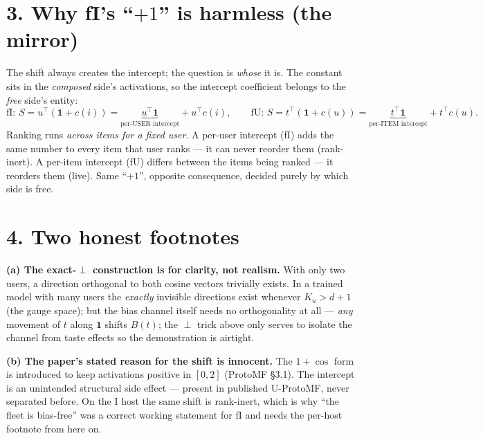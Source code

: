 \documentclass[11pt,a4paper]{article}
\begin{document}
\section*{3. Why fI's ``$+1$'' is harmless (the mirror)}

The shift always creates the intercept; the question is \emph{whose} it is.
The constant sits in the \emph{composed} side's activations, so the intercept
coefficient belongs to the \emph{free} side's entity:
\[
\text{fI: } S = u^{\top}(\mathbf{1}+c(i)) = \underbrace{u^{\top}\mathbf{1}}_{\text{per-USER intercept}} + u^{\top}c(i),
\qquad
\text{fU: } S = t^{\top}(\mathbf{1}+c(u)) = \underbrace{t^{\top}\mathbf{1}}_{\text{per-ITEM intercept}} + t^{\top}c(u).
\]
Ranking runs \emph{across items for a fixed user}. A per-user intercept (fI)
adds the same number to every item that user ranks --- it can never reorder
them (rank-inert). A per-item intercept (fU) differs between the items being
ranked --- it reorders them (live). Same ``$+1$'', opposite consequence,
decided purely by which side is free.

\section*{4. Two honest footnotes}

\textbf{(a) The exact-$\perp$ construction is for clarity, not realism.} With
only two users, a direction orthogonal to both cosine vectors trivially
exists. In a trained model with many users the \emph{exactly} invisible
directions exist whenever $K_u > d+1$ (the gauge space); but the bias channel
itself needs no orthogonality at all --- \emph{any} movement of $t$ along
$\mathbf{1}$ shifts $B(t)$; the $\perp$ trick above only serves to isolate the
channel from taste effects so the demonstration is airtight.

\textbf{(b) The paper's stated reason for the shift is innocent.} The
$1+\cos$ form is introduced to keep activations positive in $[0,2]$
(ProtoMF \S3.1). The intercept is an unintended structural side effect ---
present in published U-ProtoMF, never separated before. On the I host the same
shift is rank-inert, which is why ``the fleet is bias-free'' was a correct
working statement for fI and needs the per-host footnote from here on.
\end{document}
